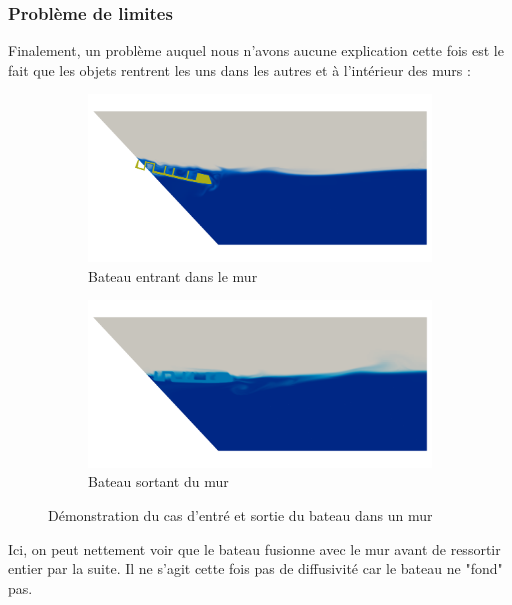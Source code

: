\documentclass[../main.tex]{subfiles}
\begin{document}
\subsubsection*{Problème de limites}
Finalement, un problème auquel nous n'avons aucune explication cette fois est le fait que les objets rentrent les uns dans les autres et à l'intérieur des murs :
\begin{figure}[H]
\centering
\begin{subfigure}[b]{8.4cm}
    \centering
    \includegraphics[width=\linewidth]{IMAGES/part2/zephyr_launching.0089.png}
    \caption{Bateau entrant dans le mur}
\end{subfigure}
\hfill
\begin{subfigure}[b]{8.4cm}
    \centering
    \includegraphics[width=\linewidth]{IMAGES/part2/wall_pb.png}
    \caption{Bateau sortant du mur}
\end{subfigure}
\caption{Démonstration du cas d'entré et sortie du bateau dans un mur}
\end{figure}

Ici, on peut nettement voir que le bateau fusionne avec le mur avant de ressortir entier par la suite. Il ne s'agit cette fois pas de diffusivité car le bateau ne "fond" pas.
\end{document}
